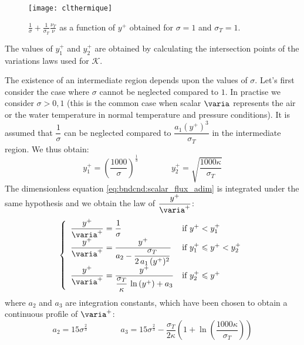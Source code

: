 \begin{figure}[!htp]
\centering
\texttt{[image: clthermique]}
\caption{$\frac{1}{\sigma} + \frac{1}{\sigma_T}\frac{\nu_T}{\nu} $ as a function of $y^+$ obtained
 for $\sigma=1$ and $\sigma_T=1$. \label{fig:bndcnd:3layer_temperature_wall_function}}
\end{figure}

The values of $y^+_1$ and $y^+_2$ are obtained by calculating 
the intersection points of the variations laws used 
for $\mathcal{K}$.

The existence of an intermediate region depends upon the 
values of $\sigma$.
Let's first consider the case where $\sigma$ cannot be neglected 
compared to $1$. In practise we consider  $\sigma > 0,1$ 
(this is the common case when scalar $\varia$ represents
the air or the water temperature in normal temperature 
and pressure conditions). It is assumed that 
$\displaystyle\dfrac{1}{\sigma}$ can be neglected compared to 
$\displaystyle\dfrac{a_1 (y^+)^3}{\sigma_T}$ in the 
intermediate region.
We thus obtain:
\begin{equation}
  y^+_1 =\left(\displaystyle\frac{1000}{\sigma}\right)^\frac{1}{3} \qquad\qquad
  y^+_2 = \sqrt{\displaystyle\frac{1000\kappa}{\sigma_T}}
\end{equation}
The dimensionless equation \eqref{eq:bndcnd:scalar_flux_adim}
is integrated under the same hypothesis and we obtain the law of $\dfrac{y^+}{\varia^+}$:
\begin{equation}\label{eq:bndcnd:wallfunctions_t_3layers}
\left\{
\begin{array}{ll}
\dfrac{y^+}{\varia^+} = \dfrac{1}{\sigma} & \text{if } y^+ < y^+_1 \\
\dfrac{y^+}{\varia^+} = \dfrac{y^+}{a_2 -\displaystyle\frac{\sigma_T}{2\,a_1\,(y^+)^2}}& \text{if } y_1^+ \leqslant y^+ < y_2^+ \\
\dfrac{y^+}{\varia^+} = \dfrac{y^+}{\dfrac{\sigma_T}{\kappa}\,\ln \left(y^+ \right)+a_3} & \text{if } y^+_2 \leqslant y^+
\end{array}
\right.
\end{equation}
where $a_2$ and $a_3$ are integration constants,
which have been chosen to obtain 
a continuous  profile of $\varia^+$:
\begin{equation}
a_2=15\sigma^{\frac{2}{3}}\qquad\qquad
a_3=15\sigma^{\frac{2}{3}}-\displaystyle\frac{\sigma_T}{2\kappa}
\left(1+
\ln \left(\displaystyle\frac{1000\kappa}{\sigma_T}\right)\right)
\end{equation}

